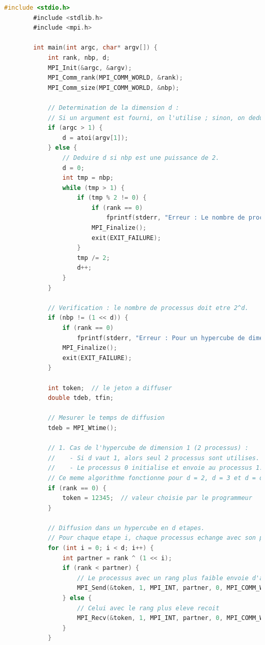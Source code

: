 \documentclass[a4paper,13pt]{book}
\begin{document}
	\begin{lstlisting}[language=C, caption=Code source de \texttt{hypercube.c}]
        #include <stdio.h>
        #include <stdlib.h>
        #include <mpi.h>
        
        int main(int argc, char* argv[]) {
            int rank, nbp, d;
            MPI_Init(&argc, &argv);
            MPI_Comm_rank(MPI_COMM_WORLD, &rank);
            MPI_Comm_size(MPI_COMM_WORLD, &nbp);
        
            // Determination de la dimension d :
            // Si un argument est fourni, on l'utilise ; sinon, on deduit d a partir du nb de processus.
            if (argc > 1) {
                d = atoi(argv[1]);
            } else {
                // Deduire d si nbp est une puissance de 2.
                d = 0;
                int tmp = nbp;
                while (tmp > 1) {
                    if (tmp % 2 != 0) {
                        if (rank == 0)
                            fprintf(stderr, "Erreur : Le nombre de processus doit etre une puissance de 2.\n");
                        MPI_Finalize();
                        exit(EXIT_FAILURE);
                    }
                    tmp /= 2;
                    d++;
                }
            }
        
            // Verification : le nombre de processus doit etre 2^d.
            if (nbp != (1 << d)) {
                if (rank == 0)
                    fprintf(stderr, "Erreur : Pour un hypercube de dimension %d, il faut 2^d processus (ici %d processus).\n", d, nbp);
                MPI_Finalize();
                exit(EXIT_FAILURE);
            }
        
            int token;  // le jeton a diffuser
            double tdeb, tfin;
            
            // Mesurer le temps de diffusion
            tdeb = MPI_Wtime();
        
            // 1. Cas de l'hypercube de dimension 1 (2 processus) :
            //    - Si d vaut 1, alors seul 2 processus sont utilises.
            //    - Le processus 0 initialise et envoie au processus 1.
            // Ce meme algorithme fonctionne pour d = 2, d = 3 et d = d general.
            if (rank == 0) {
                token = 12345;  // valeur choisie par le programmeur
            }
            
            // Diffusion dans un hypercube en d etapes.
            // Pour chaque etape i, chaque processus echange avec son partenaire defini par rank xor (1 << i).
            for (int i = 0; i < d; i++) {
                int partner = rank ^ (1 << i);
                if (rank < partner) {
                    // Le processus avec un rang plus faible envoie d'abord
                    MPI_Send(&token, 1, MPI_INT, partner, 0, MPI_COMM_WORLD);
                } else {
                    // Celui avec le rang plus eleve recoit
                    MPI_Recv(&token, 1, MPI_INT, partner, 0, MPI_COMM_WORLD, MPI_STATUS_IGNORE);
                }
            }
            

\end{lstlisting}
\end{document}
